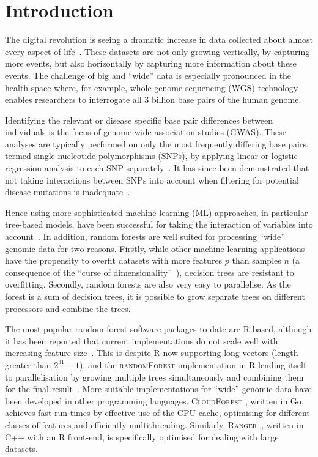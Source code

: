 \documentclass[10pt,letterpaper]{article}
\newcommand{\ranger}{\textsc{Ranger}\xspace}
\newcommand{\randomforest}{\textsc{randomForest}\xspace}
\begin{document}
\linenumbers

\section{Introduction}
The digital revolution is seeing a dramatic increase in data collected about almost every aspect of
life~\cite{Loebbecke2015}.  These datasets are not only growing vertically, by capturing more events, but also
horizontally by capturing more information about these events.  The challenge of big and ``wide'' data is especially
pronounced in the health space where, for example, whole genome sequencing (WGS) technology enables researchers to
interrogate all 3 billion base pairs of the human genome.

Identifying the relevant or disease specific base pair differences between individuals is the focus of genome wide
association studies (GWAS).  These analyses are typically performed on only the most frequently differing base pairs,
termed single nucleotide polymorphisms (SNPs), by applying linear or logistic regression analysis to each SNP
separately~\cite{CCC2007}.  It has since been demonstrated that not taking interactions between SNPs into account
when filtering for potential disease mutations is inadequate~\cite{Manolio2009,Yang2011}.

Hence using more sophisticated machine learning (ML) approaches, in particular tree-based models, have been successful
for taking the interaction of variables into account~\cite{Wright.et.al.2016}. In addition, random forests are well
suited for processing ``wide'' genomic data for two reasons.  Firstly, while other machine learning applications have
the propensity to overfit datasets with more features $p$ than samples $n$ (a consequence of the ``curse of
dimensionality''~\cite{Bauer2014, bellman1961adaptive}), decision trees are resistant to overfitting.  Secondly, random
forests are also very easy to parallelise. As the forest is a sum of decision trees, it is possible to grow separate
trees on different processors and combine the trees. 

The most popular random forest software packages to date are R-based, although it has been reported that current implementations 
do not scale well with increasing feature size~\cite{Wright.and.Ziegle.2016}.  This is despite R now supporting long vectors (length greater
than $2^{31}-1$), and the \randomforest implementation in R lending itself to parallelisation by growing multiple
trees simultaneously and combining them for the final result~\cite{Liaw.and.Weiner.2002}.  More suitable implementations for ``wide''
genomic data have been developed in other programming languages. \textsc{CloudForest} \cite{Bressler2015}, written in Go,
achieves fast run times by effective use of the CPU cache, optimising for different classes of features and efficiently
multithreading.  Similarly, \ranger~\cite{Wright.and.Ziegle.2016}, written in C++ with an R front-end, is
specifically optimised for dealing with large datasets.
\end{document}
